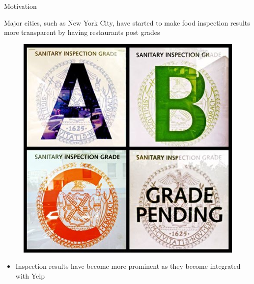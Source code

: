 \documentclass[handout]{beamer}
\begin{document}
\begin{frame}{Motivation}
    \begin{itemize}
    \begin{minipage}{0.7\linewidth}
    \item Major cities, such as New York City, have started to make food inspection results more transparent by having restaurants post grades
    \end{minipage} 
    \begin{minipage}{0.25\linewidth}
    \begin{figure}
    \includegraphics[scale = 0.1]{grades.jpg}
    \end{figure}
    \end{minipage}
    \begin{itemize}
    \item Inspection results have become more prominent as they become integrated with Yelp
    \end{itemize}
    \end{itemize}
   
\end{frame}
\end{document}

